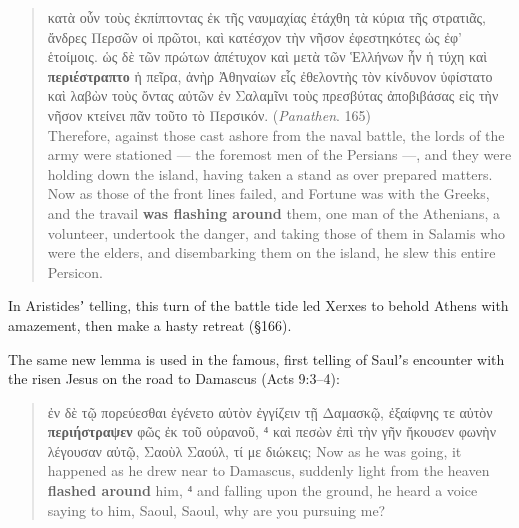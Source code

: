 \vspace*{2.5mm} 
 \begin{quote}κατὰ οὖν τοὺς ἐκπίπτοντας ἐκ τῆς ναυμαχίας ἐτάχθη τὰ κύρια τῆς στρατιᾶς, %
 ἄνδρες Περσῶν οἱ πρῶτοι, %
 καὶ κατέσχον τὴν νῆσον ἐφεστηκότες ὡς ἐφ’ ἑτοίμοις. %
 ὡς δὲ τῶν πρώτων ἀπέτυχον
 καὶ μετὰ τῶν Ἑλλήνων ἦν ἡ τύχη καὶ \textbf{περιέστραπτο} ἡ πεῖρα, %
 ἀνὴρ Ἀθηναίων εἷς ἐθελοντὴς τὸν κίνδυνον ὑφίστατο %
 καὶ λαβὼν τοὺς ὄντας αὐτῶν ἐν Σαλαμῖνι τοὺς πρεσβύτας %
 ἀποβιβάσας εἰς τὴν νῆσον κτείνει πᾶν τοῦτο τὸ Περσικόν. (\textit{Panathen}. 165) \\[1mm] %
 Therefore, against those cast ashore from the naval battle, %
 the lords of the army were stationed ---  %
 the foremost men of the Persians ---, %
 and they were holding down the island, 
 having taken a stand as over prepared matters. %
 Now as those of the front lines failed, %
 and Fortune was with the Greeks, %
 and the travail \textbf{was flashing around} them, %
 one man of the Athenians, a volunteer, %
 undertook the danger, %
 and taking those of them in Salamis who were the elders, %
 and disembarking them on the island, he slew this entire Persicon. %
 \end{quote} %
 \vspace*{2.5mm}

\noindent{}In Aristidesʼ telling, this turn of the battle tide %
led Xerxes to behold Athens with amazement, then make a hasty retreat (§166). %

The same new lemma is used in the famous, first telling of Saulʼs encounter with the risen Jesus %
on the road to Damascus (Acts 9:3--4): 

\vspace*{2.5mm} 
 \begin{quote}ἐν δὲ τῷ πορεύεσθαι ἐγένετο αὐτὸν ἐγγίζειν τῇ Δαμασκῷ, %
 ἐξαίφνης τε αὐτὸν \textbf{περιήστραψεν} φῶς ἐκ τοῦ οὐρανοῦ, %
 ⁴ καὶ πεσὼν ἐπὶ τὴν γῆν ἤκουσεν φωνὴν λέγουσαν αὐτῷ, %
 Σαοὺλ Σαούλ, τί με διώκεις; \clearpage %
 Now as he was going, it happened as he drew near to Damascus, %
 suddenly light from the heaven \textbf{flashed around} him, %
 ⁴ and falling upon the ground, he heard a voice saying to him, %
 Saoul, Saoul, why are you pursuing me? %
 \end{quote} %
 \vspace*{2.5mm}


